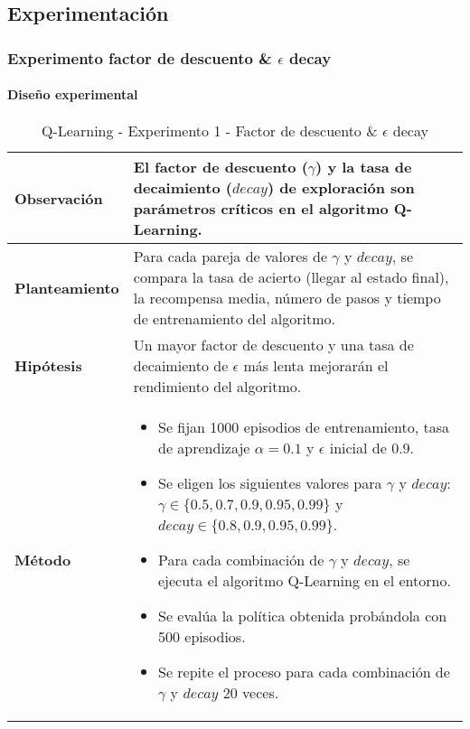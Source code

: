 \subsection{Experimentación}

\subsubsection{Experimento factor de descuento \& \(\epsilon\) decay}

\paragraph{Diseño experimental}

\begin{table}[H]
    \centering
    \begin{tabularx}{\textwidth}{|p{4cm}|X|} %
        \hline %
        \textbf{Observación} & El factor de descuento ($\gamma$) y la tasa de decaimiento ($decay$) de exploración son parámetros críticos en el algoritmo Q-Learning. 
        \\ \hline 
        \textbf{Planteamiento} & Para cada pareja de valores de $\gamma$ y $decay$, se compara la tasa de acierto (llegar al estado final), la recompensa media, número de pasos y tiempo de entrenamiento del algoritmo.
        \\ \hline 
        \textbf{Hipótesis} & Un mayor factor de descuento y una tasa de decaimiento de $\epsilon$ más lenta mejorarán el rendimiento del algoritmo.
        \\ \hline 
        \textbf{Método} & 
        \begin{itemize}
            \item Se fijan 1000 episodios de entrenamiento, tasa de aprendizaje \(\alpha = 0.1\) y \(\epsilon\) inicial de $0.9$.
            \item Se eligen los siguientes valores para \(\gamma\) y $decay$: \(\gamma \in \{0.5, 0.7, 0.9, 0.95, 0.99\}\) y $decay \in \{0.8, 0.9, 0.95, 0.99\}$.
            \item Para cada combinación de \(\gamma\) y $decay$, se ejecuta el algoritmo Q-Learning en el entorno.
            \item Se evalúa la política obtenida probándola con 500 episodios.
            \item Se repite el proceso para cada combinación de \(\gamma\) y $decay$ 20 veces.
        \end{itemize}
        \\ \hline
    \end{tabularx}
    \caption{Q-Learning - Experimento 1 - Factor de descuento \& $\epsilon$ decay}
    \label{tab:diseñoQLEarningExp1}
\end{table}

